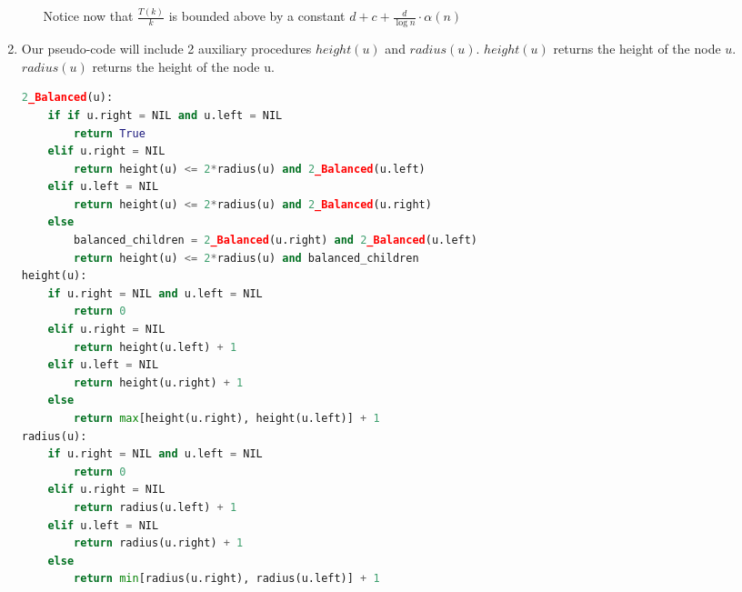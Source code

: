 \documentclass{article}
\begin{document}
\begin{enumerate}
\begin{enumerate}
        Notice now that $\frac{T(k)}{k}$ is bounded above by a constant  $d + c + \frac{d}{\log n}\cdot \alpha(n)$
    \end{enumerate}
\item 
Our pseudo-code will include 2 auxiliary procedures $height(u)$ and $radius(u)$. $height(u)$ returns the height of the node $u$.$radius(u)$ returns the height of the node u.\\
\lstset{numbers=left, numberstyle=\tiny, stepnumber=1, numbersep=5pt}
\begin{lstlisting}[language=Python]
2_Balanced(u): 
    if if u.right = NIL and u.left = NIL
        return True
    elif u.right = NIL 
        return height(u) <= 2*radius(u) and 2_Balanced(u.left)
    elif u.left = NIL
        return height(u) <= 2*radius(u) and 2_Balanced(u.right)
    else
        balanced_children = 2_Balanced(u.right) and 2_Balanced(u.left)
        return height(u) <= 2*radius(u) and balanced_children
height(u):
    if u.right = NIL and u.left = NIL
        return 0
    elif u.right = NIL 
        return height(u.left) + 1
    elif u.left = NIL
        return height(u.right) + 1
    else
        return max[height(u.right), height(u.left)] + 1
radius(u):
    if u.right = NIL and u.left = NIL
        return 0
    elif u.right = NIL 
        return radius(u.left) + 1
    elif u.left = NIL
        return radius(u.right) + 1
    else
        return min[radius(u.right), radius(u.left)] + 1
\end{lstlisting}
\end{enumerate}
\end{document}
